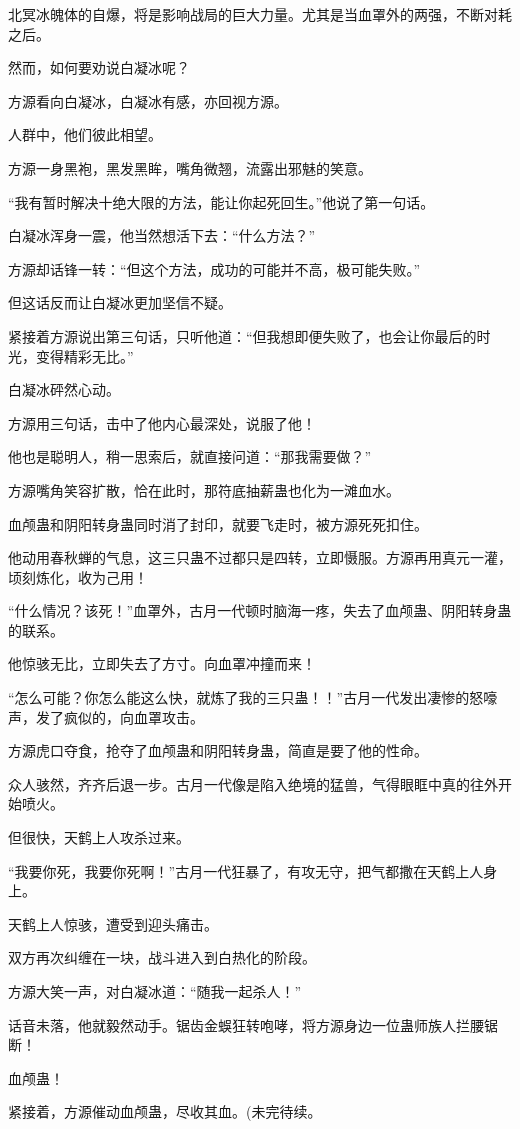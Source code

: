 \begin{this_body}
北冥冰魄体的自爆，将是影响战局的巨大力量。尤其是当血罩外的两强，不断对耗之后。

然而，如何要劝说白凝冰呢？

方源看向白凝冰，白凝冰有感，亦回视方源。

人群中，他们彼此相望。

方源一身黑袍，黑发黑眸，嘴角微翘，流露出邪魅的笑意。

“我有暂时解决十绝大限的方法，能让你起死回生。”他说了第一句话。

白凝冰浑身一震，他当然想活下去：“什么方法？”

方源却话锋一转：“但这个方法，成功的可能并不高，极可能失败。”

但这话反而让白凝冰更加坚信不疑。

紧接着方源说出第三句话，只听他道：“但我想即便失败了，也会让你最后的时光，变得精彩无比。”

白凝冰砰然心动。

方源用三句话，击中了他内心最深处，说服了他！

他也是聪明人，稍一思索后，就直接问道：“那我需要做？”

方源嘴角笑容扩散，恰在此时，那符底抽薪蛊也化为一滩血水。

血颅蛊和阴阳转身蛊同时消了封印，就要飞走时，被方源死死扣住。

他动用春秋蝉的气息，这三只蛊不过都只是四转，立即慑服。方源再用真元一灌，顷刻炼化，收为己用！

“什么情况？该死！”血罩外，古月一代顿时脑海一疼，失去了血颅蛊、阴阳转身蛊的联系。

他惊骇无比，立即失去了方寸。向血罩冲撞而来！

“怎么可能？你怎么能这么快，就炼了我的三只蛊！！”古月一代发出凄惨的怒嚎声，发了疯似的，向血罩攻击。

方源虎口夺食，抢夺了血颅蛊和阴阳转身蛊，简直是要了他的性命。

众人骇然，齐齐后退一步。古月一代像是陷入绝境的猛兽，气得眼眶中真的往外开始喷火。

但很快，天鹤上人攻杀过来。

“我要你死，我要你死啊！”古月一代狂暴了，有攻无守，把气都撒在天鹤上人身上。

天鹤上人惊骇，遭受到迎头痛击。

双方再次纠缠在一块，战斗进入到白热化的阶段。

方源大笑一声，对白凝冰道：“随我一起杀人！”

话音未落，他就毅然动手。锯齿金蜈狂转咆哮，将方源身边一位蛊师族人拦腰锯断！

血颅蛊！

紧接着，方源催动血颅蛊，尽收其血。(未完待续。

\end{this_body}

